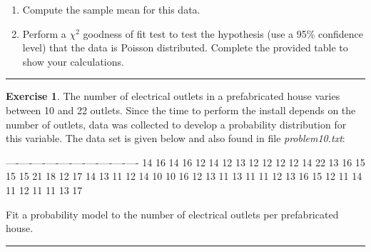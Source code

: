 \documentclass[
]{book}
\providecommand{\tightlist}{%
  \setlength{\itemsep}{0pt}\setlength{\parskip}{0pt}}
\theoremstyle{definition}
\theoremstyle{definition}
\theoremstyle{definition}
\newtheorem{exercise}{Exercise}[chapter]
\theoremstyle{definition}
\theoremstyle{remark}
\begin{document}
\begin{enumerate}
\def\labelenumi{\alph{enumi}.}
\tightlist
\item
  Compute the sample mean for this data.
\item
  Perform a \(\chi^2\) goodness of fit test to test the hypothesis (use a
  95\% confidence level) that the data is Poisson distributed. Complete the
  provided table to show your calculations.
\end{enumerate}

\begin{center}\rule{0.5\linewidth}{0.5pt}\end{center}

\begin{exercise}
\protect\hypertarget{exr:AppDistFitP10}{}{\label{exr:AppDistFitP10} }The number of electrical outlets in a prefabricated house varies between
10 and 22 outlets. Since the time to perform the install depends on the
number of outlets, data was collected to develop a probability
distribution for this variable. The data set is given below and also found in file \emph{problem10.txt}:
\end{exercise}
\textbar{} \textbar{} \textbar{} \textbar{} \textbar{} \textbar{} \textbar{} \textbar{} \textbar{} \textbar{} \textbar{}
\textbar----\textbar----\textbar----\textbar----\textbar----\textbar----\textbar----\textbar----\textbar----\textbar----\textbar{}
\textbar{} 14 \textbar{} 16 \textbar{} 14 \textbar{} 16 \textbar{} 12 \textbar{} 14 \textbar{} 12 \textbar{} 13 \textbar{} 12 \textbar{} 12 \textbar{}
\textbar{} 12 \textbar{} 12 \textbar{} 14 \textbar{} 22 \textbar{} 13 \textbar{} 16 \textbar{} 15 \textbar{} 15 \textbar{} 15 \textbar{} 21 \textbar{}
\textbar{} 18 \textbar{} 12 \textbar{} 17 \textbar{} 14 \textbar{} 13 \textbar{} 11 \textbar{} 12 \textbar{} 14 \textbar{} 10 \textbar{} 10 \textbar{}
\textbar{} 16 \textbar{} 12 \textbar{} 13 \textbar{} 11 \textbar{} 13 \textbar{} 11 \textbar{} 11 \textbar{} 12 \textbar{} 13 \textbar{} 16 \textbar{}
\textbar{} 15 \textbar{} 12 \textbar{} 11 \textbar{} 14 \textbar{} 11 \textbar{} 12 \textbar{} 11 \textbar{} 11 \textbar{} 13 \textbar{} 17 \textbar{}

Fit a probability model to the number of electrical outlets per
prefabricated house.

\begin{center}\rule{0.5\linewidth}{0.5pt}\end{center}
\end{document}
